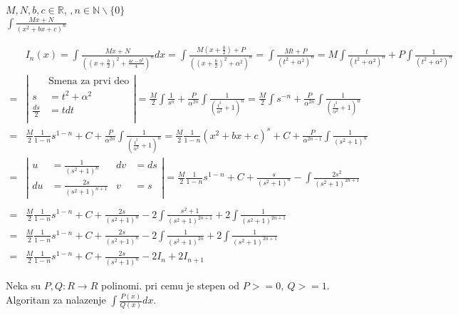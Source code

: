 \documentclass{article}
\begin{document}
\begin{primbox}
    $M, N, b, c \in \mathbb{R}$,
    $, n \in \mathbb{N}\backslash\{0\}$\\
    $\int \frac{Mx + N}{(x^2 + bx + c)^n}$
\end{primbox}
\begin{align*}
      & I_n (x) = \int \frac{Mx + N}{((x+\frac{b}{2})^2 + \frac{4c-b^2}{4})^n}dx
    = \int \frac{M(x+\frac{b}{2}) + P}{((x+\frac{b}{2})^2 + \alpha^2)^n}
    = \int \frac{Mt + P}{(t^2 + \alpha ^2)^n}
    = M\int\frac{t}{(t^2+\alpha^2)^n} + P\int\frac{1}{(t^2 + \alpha^2)^n}                                                           \\
    = & \left | \begin{alignedat}{3}
                                 & \text{Smena za prvi deo} \\
                    s            & = t^2 + \alpha^2         \\
                    \frac{ds}{2} & = t dt                   \\
                \end{alignedat} \right |
    = \frac{M}{2} \int \frac{1}{s^n} + \frac{P}{\alpha^{2n}}\int\frac{1}{(\frac{t^2}{\alpha^2} + 1)^n}=
    \frac{M}{2}\int s^{-n} + \frac{P}{\alpha^{2n}}\int\frac{1}{(\frac{t^2}{\alpha^2} + 1)^n}                                        \\ = &
    \frac{M}{2} \frac{1}{1-n}s^{1-n} + C + \frac{P}{\alpha^{2n}}\int\frac{1}{(\frac{t^2}{\alpha^2} + 1)^n}
    = \frac{M}{2}\frac{1}{1-n}(x^2+bx + c)^s + C + \frac{P}{\alpha^{2n-1}}\int\frac{1}{(s^2 + 1)^n}                                 \\
    = & \left | \begin{alignedat}{2}
                    u  & = \frac{1}{(s^2+1)^n}      & dv & = ds \\
                    du & = \frac{2s}{(s^2+1)^{n+1}} & v  & = s
                \end{alignedat} \right |
    = \frac{M}{2} \frac{1}{1-n}s^{1-n} + C + \frac{s}{(s^2 + 1)^n} - \int\frac{2s^2}{(s^2+1)^{2n+1}}                                \\
    \\ = & \frac{M}{2} \frac{1}{1-n}s^{1-n} + C + \frac{2s}{(s^2 + 1)^n} - 2\int\frac{s^2 + 1}{(s^2+1)^{2n+1}} + 2\int\frac{1}{(s^2+1)^{2n+1}}\\
    = & \frac{M}{2} \frac{1}{1-n}s^{1-n} + C + \frac{2s}{(s^2 + 1)^n} - 2\int\frac{1}{(s^2+1)^{2n}} + 2\int\frac{1}{(s^2+1)^{2n+1}} \\
    = & \frac{M}{2} \frac{1}{1-n}s^{1-n} + C + \frac{2s}{(s^2 + 1)^n} - 2I_n + 2I_{n+1}
\end{align*}
\begin{primbox}
    Neka su $P, Q: R \longrightarrow R$ polinomi. pri cemu je stepen od $P >= 0,\ Q >= 1$.
    Algoritam za nalazenje $\int \frac{P(x)}{Q(x)}dx$.
\end{primbox}
\end{document}
